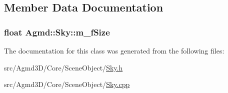\subsection{Member Data Documentation}
\hypertarget{class_agmd_1_1_sky_a39f71193184fd17b072aaaf48f964832}{
\subsubsection[{m\+\_\+f\+Size}]{\setlength{\rightskip}{0pt plus 5cm}float Agmd\+::\+Sky\+::m\+\_\+f\+Size\hspace{0.3cm}{\ttfamily [protected]}}}\label{class_agmd_1_1_sky_a39f71193184fd17b072aaaf48f964832}


The documentation for this class was generated from the following files\+:\begin{DoxyCompactItemize}
\item 
src/\+Agmd3\+D/\+Core/\+Scene\+Object/\hyperlink{_sky_8h}{Sky.\+h}\item 
src/\+Agmd3\+D/\+Core/\+Scene\+Object/\hyperlink{_sky_8cpp}{Sky.\+cpp}\end{DoxyCompactItemize}
